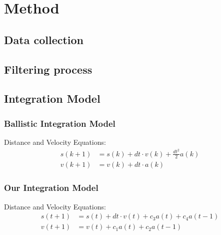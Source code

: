 
\section{Method}

\subsection{Data collection}

\subsection{Filtering process}

\subsection{Integration Model}



\begin{frame}
  \frametitle{Ballistic Integration Model }

    Distance and Velocity Equations:
    \begin{align*}
        s(k+1) &= s(k) + dt \cdot v(k) + \frac{dt^2}{2} a(k) \\
        v(k+1) &= v(k) + dt \cdot a(k)
    \end{align*}

    \hfil
{}

\end{frame}




\begin{frame}
  \frametitle{Our Integration Model }

    Distance and Velocity Equations:
    \begin{align*}
    s(t+1) &= s(t) + dt \cdot v(t)+ c_3 a(t) + c_4 a(t-1) \\
    v(t+1) &= v(t) + c_1 a(t) + c_2a(t-1)
    \end{align*}

    \hfil
{}

\end{frame}


